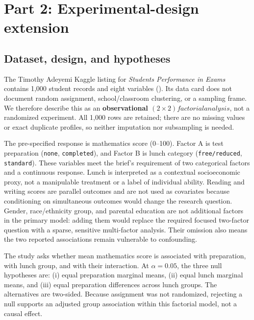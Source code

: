 \documentclass[
  10pt,
]{article}
\begin{document}
\clearpage

\section{Part 2: Experimental-design
extension}\label{part-2-experimental-design-extension}

\subsection{Dataset, design, and
hypotheses}\label{dataset-design-and-hypotheses}

The Timothy Adeyemi Kaggle listing for \emph{Students Performance in
Exams} contains 1,000 student records and eight variables
(). Its data card
does not document random assignment, school/classroom clustering, or a
sampling frame. We therefore describe this as an \textbf{observational
$(2\times2) factorial analysis$}, not a randomized experiment. All 1,000
rows are retained; there are no missing values or exact duplicate
profiles, so neither imputation nor subsampling is needed.

The pre-specified response is mathematics score (0--100). Factor A is
test preparation (\texttt{none}, \texttt{completed}), and Factor B is
lunch category (\texttt{free/reduced}, \texttt{standard}). These
variables meet the brief's requirement of two categorical factors and a
continuous response. Lunch is interpreted as a contextual socioeconomic
proxy, not a manipulable treatment or a label of individual ability.
Reading and writing scores are parallel outcomes and are not used as
covariates because conditioning on simultaneous outcomes would change
the research question. Gender, race/ethnicity group, and parental
education are not additional factors in the primary model: adding them
would replace the required focused two-factor question with a sparse,
sensitive multi-factor analysis. Their omission also means the two
reported associations remain vulnerable to confounding.

The study asks whether mean mathematics score is associated with
preparation, with lunch group, and with their interaction. At
\(\alpha=0.05\), the three null hypotheses are: (i) equal preparation
marginal means, (ii) equal lunch marginal means, and (iii) equal
preparation differences across lunch groups. The alternatives are
two-sided. Because assignment was not randomized, rejecting a null
supports an adjusted group association within this factorial model, not
a causal effect.
\end{document}
